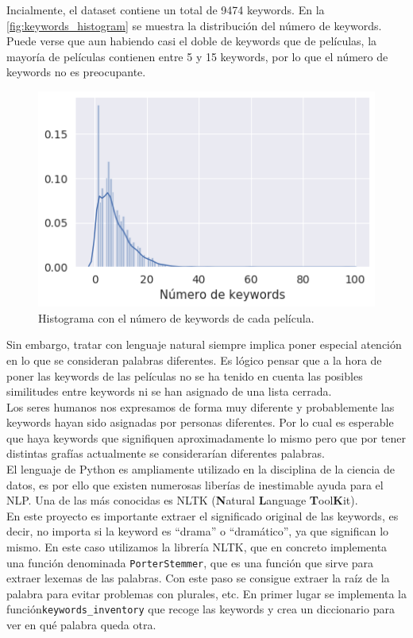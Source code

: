 Incialmente, el dataset contiene un total de 9474 keywords. En la \autoref{fig:keywords_histogram} se muestra la distribución del número de keywords. Puede verse que aun habiendo casi el doble de keywords que de películas, la mayoría de películas contienen entre 5 y 15 keywords, por lo que el número de keywords no es preocupante.
\begin{figure}[H]
    \centering
    \captionsetup{width=10cm}
    \includegraphics[width=12cm]{contenido/imagenes/keyword_histogram.png}
    \caption{Histograma con el número de keywords de cada película.}
    \label{fig:keywords_histogram}
\end{figure}

Sin embargo, tratar con lenguaje natural siempre implica poner especial atención en lo que se consideran palabras diferentes. Es lógico pensar que a la hora de poner las keywords de las películas no se ha tenido en cuenta las posibles similitudes entre keywords ni se han asignado de una lista cerrada.\\

Los seres humanos nos expresamos de forma muy diferente y probablemente las keywords hayan sido asignadas por personas diferentes. Por lo cual es esperable que haya keywords que signifiquen aproximadamente lo mismo pero que por tener distintas grafías actualmente se considerarían diferentes palabras.\\

El lenguaje de Python es ampliamente utilizado en la disciplina de la ciencia de datos, es por ello que existen numerosas liberías de inestimable ayuda para el NLP. Una de las más conocidas es NLTK \cite{NLTK} (\textbf{N}atural \textbf{L}anguage \textbf{T}ool\textbf{K}it).\\

En este proyecto es importante extraer el significado original de las keywords, es decir, no importa si la keyword es ``drama'' o ``dramático'', ya que significan lo mismo. En este caso utilizamos la librería NLTK, que en concreto implementa una función denominada \texttt{PorterStemmer}\cite{porter}, que es una función que sirve para extraer lexemas de las palabras. Con este paso se consigue extraer la raíz de la palabra para evitar problemas con plurales, etc. En primer lugar se implementa la función\texttt{keywords\_inventory} que recoge las keywords y crea un diccionario para ver en qué palabra queda otra.

